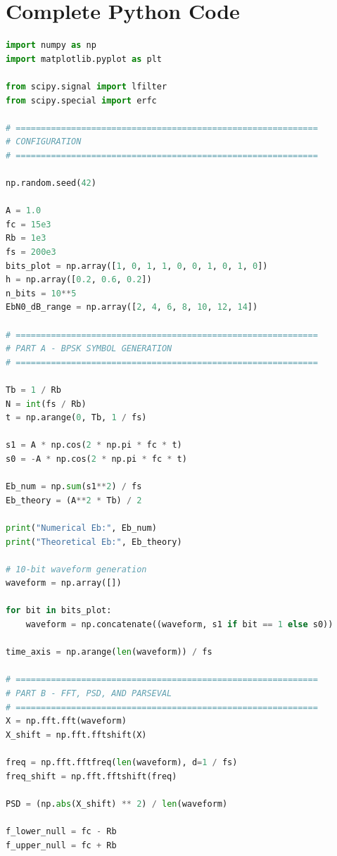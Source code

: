 \chapter{Complete Python Code}

\begin{lstlisting}[language=Python,
    caption={Complete Python implementation for Batch 9 BPSK system},
    basicstyle=\ttfamily\small,
    breaklines=true,
    showstringspaces=false]
import numpy as np
import matplotlib.pyplot as plt

from scipy.signal import lfilter
from scipy.special import erfc

# ============================================================
# CONFIGURATION
# ============================================================

np.random.seed(42)

A = 1.0
fc = 15e3
Rb = 1e3
fs = 200e3
bits_plot = np.array([1, 0, 1, 1, 0, 0, 1, 0, 1, 0])
h = np.array([0.2, 0.6, 0.2])
n_bits = 10**5
EbN0_dB_range = np.array([2, 4, 6, 8, 10, 12, 14])

# ============================================================
# PART A - BPSK SYMBOL GENERATION
# ============================================================

Tb = 1 / Rb
N = int(fs / Rb)
t = np.arange(0, Tb, 1 / fs)

s1 = A * np.cos(2 * np.pi * fc * t)
s0 = -A * np.cos(2 * np.pi * fc * t)

Eb_num = np.sum(s1**2) / fs
Eb_theory = (A**2 * Tb) / 2

print("Numerical Eb:", Eb_num)
print("Theoretical Eb:", Eb_theory)

# 10-bit waveform generation
waveform = np.array([])

for bit in bits_plot:
    waveform = np.concatenate((waveform, s1 if bit == 1 else s0))

time_axis = np.arange(len(waveform)) / fs

# ============================================================
# PART B - FFT, PSD, AND PARSEVAL
# ============================================================
X = np.fft.fft(waveform)
X_shift = np.fft.fftshift(X)

freq = np.fft.fftfreq(len(waveform), d=1 / fs)
freq_shift = np.fft.fftshift(freq)

PSD = (np.abs(X_shift) ** 2) / len(waveform)

f_lower_null = fc - Rb
f_upper_null = fc + Rb


\end{lstlisting}
